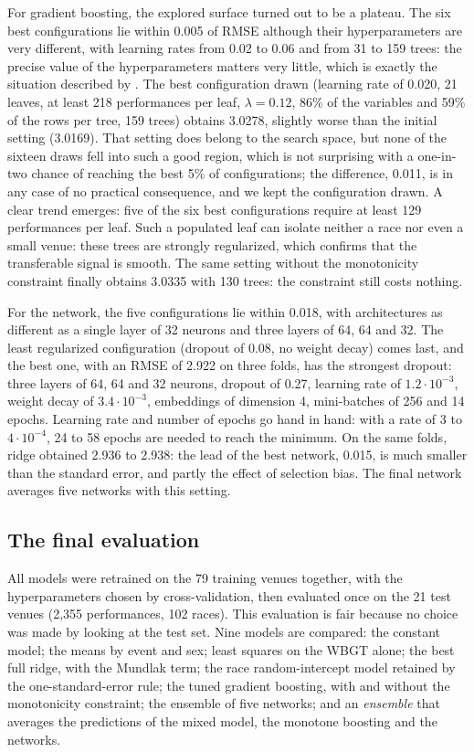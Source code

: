 \documentclass[11pt,a4paper]{article}
\begin{document}
For gradient boosting, the explored surface turned out to be a plateau. The six best configurations lie within 0.005
of RMSE although their hyperparameters are very different, with learning rates from 0.02 to 0.06 and from 31 to 159
trees: the precise value of the hyperparameters matters very little, which is exactly the situation described by
\citet{bergstra2012}. The best configuration drawn (learning rate of 0.020, 21 leaves, at least 218 performances per
leaf, $\lambda = 0.12$, 86\% of the variables and 59\% of the rows per tree, 159 trees) obtains 3.0278, slightly worse
than the initial setting (3.0169). That setting does belong to the search space, but none of the sixteen draws fell
into such a good region, which is not surprising with a one-in-two chance of reaching the best 5\% of configurations;
the difference, 0.011, is in any case of no practical consequence, and we kept the configuration drawn. A clear trend
emerges: five of the six best configurations require at least 129 performances per leaf. Such a populated leaf can
isolate neither a race nor even a small venue: these trees are strongly regularized, which confirms that the
transferable signal is smooth. The same setting without the monotonicity constraint finally obtains 3.0335 with 130
trees: the constraint still costs nothing.

For the network, the five configurations lie within 0.018, with architectures as different as a single layer of 32
neurons and three layers of 64, 64 and 32. The least regularized configuration (dropout of 0.08, no weight decay) comes
last, and the best one, with an RMSE of 2.922 on three folds, has the strongest dropout: three layers of 64, 64 and 32
neurons, dropout of 0.27, learning rate of $1.2\cdot10^{-3}$, weight decay of $3.4\cdot10^{-3}$, embeddings of
dimension 4, mini-batches of 256 and 14 epochs. Learning rate and number of epochs go hand in hand: with a rate of $3$
to $4\cdot10^{-4}$, 24 to 58 epochs are needed to reach the minimum. On the same folds, ridge obtained 2.936 to 2.938:
the lead of the best network, 0.015, is much smaller than the standard error, and partly the effect of selection bias.
The final network averages five networks with this setting.

\subsection{The final evaluation}\label{sec:test}

All models were retrained on the 79 training venues together, with the hyperparameters chosen by cross-validation,
then evaluated once on the 21 test venues (2,355 performances, 102 races). This evaluation is fair because no choice
was made by looking at the test set. Nine models are compared: the constant model; the means by event and sex; least
squares on the WBGT alone; the best full ridge, with the Mundlak term; the race random-intercept model retained by the
one-standard-error rule; the tuned gradient boosting, with and without the monotonicity constraint; the ensemble of
five networks; and an \emph{ensemble} that averages the predictions of the mixed model, the monotone boosting and the
networks.
\end{document}
